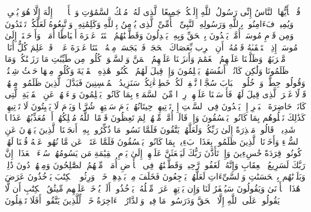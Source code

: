 \stopbuffer
\startbuffer[\q:7:158]
قُلۡ یَٰۤأَیُّهَا ٱلنَّاسُ إِنِّی رَسُولُ ٱللَّهِ إِلَیۡكُمۡ جَمِیعًا ٱلَّذِی لَهُۥ مُلۡكُ ٱلسَّمَٰوَٰتِ وَٱلۡأَرۡضِۖ لَاۤ إِلَٰهَ إِلَّا هُوَ یُحۡیِۦ وَیُمِیتُۖ فَءَامِنُوا۟ بِٱللَّهِ وَرَسُولِهِ ٱلنَّبِیِّ ٱلۡأُمِّیِّ ٱلَّذِی یُؤۡمِنُ بِٱللَّهِ وَكَلِمَٰتِهِۦ وَٱتَّبِعُوهُ لَعَلَّكُمۡ تَهۡتَدُونَ%
\stopbuffer
\startbuffer[\q:7:159]
وَمِن قَوۡمِ مُوسَىٰۤ أُمَّةࣱ یَهۡدُونَ بِٱلۡحَقِّ وَبِهِۦ یَعۡدِلُونَ%
\stopbuffer
\startbuffer[\q:7:160]
وَقَطَّعۡنَٰهُمُ ٱثۡنَتَیۡ عَشۡرَةَ أَسۡبَاطًا أُمَمࣰاۚ وَأَوۡحَیۡنَاۤ إِلَىٰ مُوسَىٰۤ إِذِ ٱسۡتَسۡقَىٰهُ قَوۡمُهُۥۤ أَنِ ٱضۡرِب بِّعَصَاكَ ٱلۡحَجَرَۖ فَٱنۢبَجَسَتۡ مِنۡهُ ٱثۡنَتَا عَشۡرَةَ عَیۡنࣰاۖ قَدۡ عَلِمَ كُلُّ أُنَاسࣲ مَّشۡرَبَهُمۡۚ وَظَلَّلۡنَا عَلَیۡهِمُ ٱلۡغَمَٰمَ وَأَنزَلۡنَا عَلَیۡهِمُ ٱلۡمَنَّ وَٱلسَّلۡوَىٰۖ كُلُوا۟ مِن طَیِّبَٰتِ مَا رَزَقۡنَٰكُمۡۚ وَمَا ظَلَمُونَا وَلَٰكِن كَانُوۤا۟ أَنفُسَهُمۡ یَظۡلِمُونَ%
\stopbuffer
\startbuffer[\q:7:161]
وَإِذۡ قِیلَ لَهُمُ ٱسۡكُنُوا۟ هَٰذِهِ ٱلۡقَرۡیَةَ وَكُلُوا۟ مِنۡهَا حَیۡثُ شِئۡتُمۡ وَقُولُوا۟ حِطَّةࣱ وَٱدۡخُلُوا۟ ٱلۡبَابَ سُجَّدࣰا نَّغۡفِرۡ لَكُمۡ خَطِیۤءَٰتِكُمۡۚ سَنَزِیدُ ٱلۡمُحۡسِنِینَ%
\stopbuffer
\startbuffer[\q:7:162]
فَبَدَّلَ ٱلَّذِینَ ظَلَمُوا۟ مِنۡهُمۡ قَوۡلًا غَیۡرَ ٱلَّذِی قِیلَ لَهُمۡ فَأَرۡسَلۡنَا عَلَیۡهِمۡ رِجۡزࣰا مِّنَ ٱلسَّمَاۤءِ بِمَا كَانُوا۟ یَظۡلِمُونَ%
\stopbuffer
\startbuffer[\q:7:163]
وَسۡءَلۡهُمۡ عَنِ ٱلۡقَرۡیَةِ ٱلَّتِی كَانَتۡ حَاضِرَةَ ٱلۡبَحۡرِ إِذۡ یَعۡدُونَ فِی ٱلسَّبۡتِ إِذۡ تَأۡتِیهِمۡ حِیتَانُهُمۡ یَوۡمَ سَبۡتِهِمۡ شُرَّعࣰا وَیَوۡمَ لَا یَسۡبِتُونَ لَا تَأۡتِیهِمۡۚ كَذَٰلِكَ نَبۡلُوهُم بِمَا كَانُوا۟ یَفۡسُقُونَ%
\stopbuffer
\startbuffer[\q:7:164]
وَإِذۡ قَالَتۡ أُمَّةࣱ مِّنۡهُمۡ لِمَ تَعِظُونَ قَوۡمًا ٱللَّهُ مُهۡلِكُهُمۡ أَوۡ مُعَذِّبُهُمۡ عَذَابࣰا شَدِیدࣰاۖ قَالُوا۟ مَعۡذِرَةً إِلَىٰ رَبِّكُمۡ وَلَعَلَّهُمۡ یَتَّقُونَ%
\stopbuffer
\startbuffer[\q:7:165]
فَلَمَّا نَسُوا۟ مَا ذُكِّرُوا۟ بِهِۦۤ أَنجَیۡنَا ٱلَّذِینَ یَنۡهَوۡنَ عَنِ ٱلسُّوۤءِ وَأَخَذۡنَا ٱلَّذِینَ ظَلَمُوا۟ بِعَذَابِۭ بَءِیسِۭ بِمَا كَانُوا۟ یَفۡسُقُونَ%
\stopbuffer
\startbuffer[\q:7:166]
فَلَمَّا عَتَوۡا۟ عَن مَّا نُهُوا۟ عَنۡهُ قُلۡنَا لَهُمۡ كُونُوا۟ قِرَدَةً خَٰسِءِینَ%
\stopbuffer
\startbuffer[\q:7:167]
وَإِذۡ تَأَذَّنَ رَبُّكَ لَیَبۡعَثَنَّ عَلَیۡهِمۡ إِلَىٰ یَوۡمِ ٱلۡقِیَٰمَةِ مَن یَسُومُهُمۡ سُوۤءَ ٱلۡعَذَابِۗ إِنَّ رَبَّكَ لَسَرِیعُ ٱلۡعِقَابِ وَإِنَّهُۥ لَغَفُورࣱ رَّحِیمࣱ%
\stopbuffer
\startbuffer[\q:7:168]
وَقَطَّعۡنَٰهُمۡ فِی ٱلۡأَرۡضِ أُمَمࣰاۖ مِّنۡهُمُ ٱلصَّٰلِحُونَ وَمِنۡهُمۡ دُونَ ذَٰلِكَۖ وَبَلَوۡنَٰهُم بِٱلۡحَسَنَٰتِ وَٱلسَّیِّءَاتِ لَعَلَّهُمۡ یَرۡجِعُونَ%
\stopbuffer
\startbuffer[\q:7:169]
فَخَلَفَ مِنۢ بَعۡدِهِمۡ خَلۡفࣱ وَرِثُوا۟ ٱلۡكِتَٰبَ یَأۡخُذُونَ عَرَضَ هَٰذَا ٱلۡأَدۡنَىٰ وَیَقُولُونَ سَیُغۡفَرُ لَنَا وَإِن یَأۡتِهِمۡ عَرَضࣱ مِّثۡلُهُۥ یَأۡخُذُوهُۚ أَلَمۡ یُؤۡخَذۡ عَلَیۡهِم مِّیثَٰقُ ٱلۡكِتَٰبِ أَن لَّا یَقُولُوا۟ عَلَى ٱللَّهِ إِلَّا ٱلۡحَقَّ وَدَرَسُوا۟ مَا فِیهِۗ وَٱلدَّارُ ٱلۡءَاخِرَةُ خَیۡرࣱ لِّلَّذِینَ یَتَّقُونَۚ أَفَلَا تَعۡقِلُونَ%
